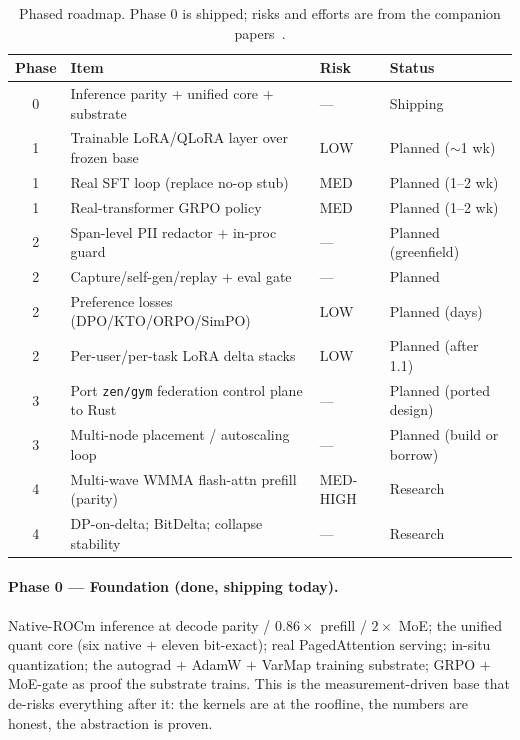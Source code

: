 \documentclass[11pt]{article}
\begin{document}
\begin{table}[h]
\centering
\caption{Phased roadmap. Phase 0 is shipped; risks and efforts are from the companion papers~\cite{hanzo-rocm,hanzo-train,hanzo-clp,hanzo-platform}.}
\label{tab:roadmap}
\small
\begin{tabular}{@{}clll@{}}
\toprule
\textbf{Phase} & \textbf{Item} & \textbf{Risk} & \textbf{Status} \\
\midrule
0 & Inference parity + unified core + substrate & --- & Shipping \\
1 & Trainable LoRA/QLoRA layer over frozen base & LOW & Planned ($\sim$1 wk) \\
1 & Real SFT loop (replace no-op stub) & MED & Planned (1--2 wk) \\
1 & Real-transformer GRPO policy & MED & Planned (1--2 wk) \\
2 & Span-level PII redactor + in-proc guard & --- & Planned (greenfield) \\
2 & Capture/self-gen/replay + eval gate & --- & Planned \\
2 & Preference losses (DPO/KTO/ORPO/SimPO) & LOW & Planned (days) \\
2 & Per-user/per-task LoRA delta stacks & LOW & Planned (after 1.1) \\
3 & Port \texttt{zen/gym} federation control plane to Rust & --- & Planned (ported design) \\
3 & Multi-node placement / autoscaling loop & --- & Planned (build or borrow) \\
4 & Multi-wave WMMA flash-attn prefill (parity) & MED-HIGH & Research \\
4 & DP-on-delta; BitDelta; collapse stability & --- & Research \\
\bottomrule
\end{tabular}
\end{table}

\paragraph{Phase 0 --- Foundation (done, shipping today).} Native-ROCm inference at decode parity / $0.86\times$ prefill / $2\times$ MoE; the unified quant core (six native $+$ eleven bit-exact); real PagedAttention serving; in-situ quantization; the autograd $+$ AdamW $+$ VarMap training substrate; GRPO $+$ MoE-gate as proof the substrate trains. This is the measurement-driven base that de-risks everything after it: the kernels are at the roofline, the numbers are honest, the abstraction is proven.
\end{document}
